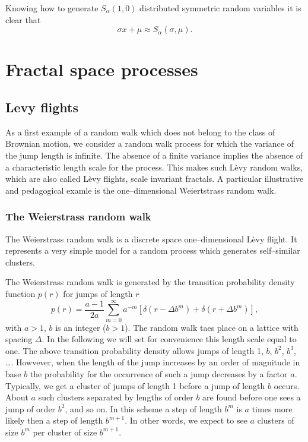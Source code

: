 Knowing how to generate $S_{\alpha}(1,0)$ distributed symmetric random 
variables it is clear that
\begin{displaymath}
  \sigma x + \mu \approx S_{\alpha}(\sigma,\mu).
\end{displaymath}


\cite{Mantegna}


\section{Fractal space processes}
\cite{ShlesingerEncyclopedia} \cite{Hughes}

\subsection{Levy flights}
As a first example of a random walk which does not belong to the  class of
Brownian motion, we consider a random walk process for which the variance of
the jump length is infinite. The absence of a finite variance implies the
absence of a characteristic length scale for
the process. This makes such L\`evy random walks, which are also called L\`evy
flights, scale invariant fractals. A particular illustrative and pedagogical
examle is the one--dimensional Weiertstrass random walk.

\subsubsection{The Weierstrass random walk}
The Weierstrass random walk is a discrete space one--dimensional L\`evy
flight. It represents a very simple model for a random process which generates
self--similar clusters.

The Weierstrass random walk is generated by the transition probability density
function $p(r)$ for jumps of length $r$
\begin{equation}
  \label{eq:transitionweierstrassrw}
  p(r) = \frac{a-1}{2a} \sum_{m=0}^{\infty} a^{-m} 
             \left[ \delta(r- \Delta b^m ) + \delta(r+ \Delta b^m )  \right],
\end{equation}
with $a>1$, $b$ is an integer ($b>1$). The random walk taes place on a lattice
with spacing $\Delta$. In the following we will set for convenience this
length scale equal to one. The above transition probability density allows
jumps of length 1, $b$, $b^2$, $b^3$, \ldots. Howvever, when the length of the
jump increases by an order of magnitude in base $b$ the probability for the
occurrence of such a jump decreases by a factor $a$. Typically, we get a
cluster of jumps of length 1 before a jump of length $b$ occurs. About $a$
such clusters separated by lengths of order $b$ are found before one sees a
jump of order $b^2$, and so on. In this scheme a step of length $b^m$ is $a$
times more likely then a step of length $b^{m+1}$. In other words, we expect
to see $a$ clusters of size $b^m$ per cluster of size $b^{m+1}$.

